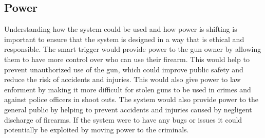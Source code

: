 \subsection{Power}

Understanding how the system could be used and how power is shifting is important to ensure that the system is designed in a way that is ethical and responsible.
The smart trigger would provide power to the gun owner by allowing them to have more control over who can use their firearm. This would help to prevent unauthorized use of the gun, 
which could improve public safety and reduce the risk of accidents and injuries. This would also give power to law enforment by making it more difficult for stolen
guns to be used in crimes and against police officers in shoot outs. The system would also provide power to the general public by helping to prevent accidents and injuries caused by negligent discharge of firearms.
If the system were to have any bugs or issues it could potentially be exploited by moving power to the criminals. 



